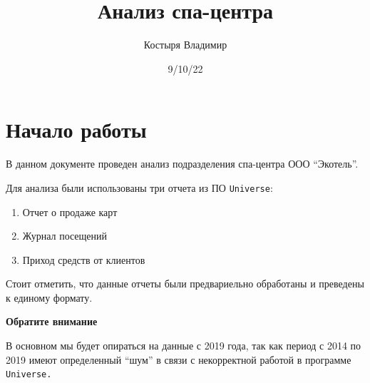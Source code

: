 \documentclass[
  letterpaper,
  DIV=11,
  numbers=noendperiod]{scrartcl}
\title{Анализ спа-центра}
\author{Костыря Владимир}
\date{9/10/22}
\providecommand{\tightlist}{%
  \setlength{\itemsep}{0pt}\setlength{\parskip}{0pt}}\usepackage{longtable,booktabs,array}
\renewcommand*\contentsname{Table of contents}
\newcommand\contentsname{Table of contents}
\begin{document}
\maketitle
\ifdefined\Shaded\renewenvironment{Shaded}{\begin{tcolorbox}[frame hidden, boxrule=0pt, borderline west={3pt}{0pt}{shadecolor}, sharp corners, interior hidden, breakable, enhanced]}{\end{tcolorbox}}\fi

\renewcommand*\contentsname{Table of contents}
{
\hypersetup{linkcolor=}
\setcounter{tocdepth}{2}
\tableofcontents
}

\hypertarget{ux43dux430ux447ux430ux43bux43e-ux440ux430ux431ux43eux442ux44b}{%
\chapter*{Начало
работы}\label{ux43dux430ux447ux430ux43bux43e-ux440ux430ux431ux43eux442ux44b}}


В данном документе проведен анализ подразделения спа-центра ООО
``Экотель''.

Для анализа были использованы три отчета из ПО \texttt{Universe}:

\begin{enumerate}
\def\labelenumi{\arabic{enumi}.}
\tightlist
\item
  Отчет о продаже карт
\item
  Журнал посещений
\item
  Приход средств от клиентов
\end{enumerate}

Стоит отметить, что данные отчеты были предвариельно обработаны и
преведены к единому формату.

\begin{tcolorbox}[enhanced jigsaw, colframe=quarto-callout-important-color-frame, leftrule=.75mm, rightrule=.15mm, toprule=.15mm, left=2mm, arc=.35mm, bottomrule=.15mm, colback=white, breakable, opacityback=0]
\begin{minipage}[t]{5.5mm}
\textcolor{quarto-callout-important-color}{\faExclamation}
\end{minipage}%
\begin{minipage}[t]{\textwidth - 5.5mm}

\textbf{Обратите внимание}\vspace{2mm}

В основном мы будет опираться на данные с 2019 года, так как период с
2014 по 2019 имеют определенный ``шум'' в связи с некорректной работой в
программе \texttt{Universe.}

\end{minipage}%
\end{tcolorbox}
\end{document}
